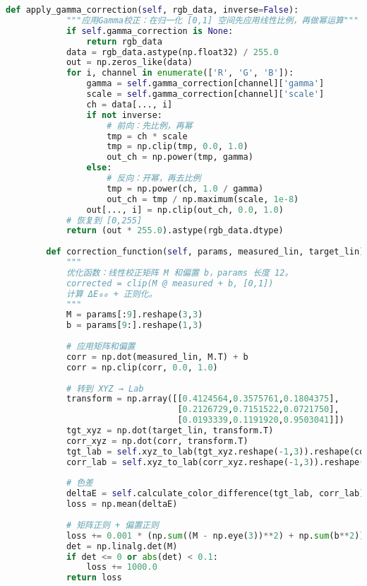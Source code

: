 \begin{lstlisting}[language=Python]
        def apply_gamma_correction(self, rgb_data, inverse=False):
            """应用Gamma校正：在归一化 [0,1] 空间先应用线性比例，再做幂运算"""
            if self.gamma_correction is None:
                return rgb_data
            data = rgb_data.astype(np.float32) / 255.0
            out = np.zeros_like(data)
            for i, channel in enumerate(['R', 'G', 'B']):
                gamma = self.gamma_correction[channel]['gamma']
                scale = self.gamma_correction[channel]['scale']
                ch = data[..., i]
                if not inverse:
                    # 前向：先比例，再幂
                    tmp = ch * scale
                    tmp = np.clip(tmp, 0.0, 1.0)
                    out_ch = np.power(tmp, gamma)
                else:
                    # 反向：开幂，再去比例
                    tmp = np.power(ch, 1.0 / gamma)
                    out_ch = tmp / np.maximum(scale, 1e-8)
                out[..., i] = np.clip(out_ch, 0.0, 1.0)
            # 恢复到 [0,255]
            return (out * 255.0).astype(rgb_data.dtype)
        
        def correction_function(self, params, measured_lin, target_lin):
            """
            优化函数：线性校正矩阵 M 和偏置 b，params 长度 12。
            corrected = clip(M @ measured + b, [0,1])
            计算 ΔE₀₀ + 正则化。
            """
            M = params[:9].reshape(3,3)
            b = params[9:].reshape(1,3)
    
            # 应用矩阵和偏置
            corr = np.dot(measured_lin, M.T) + b
            corr = np.clip(corr, 0.0, 1.0)
    
            # 转到 XYZ → Lab
            transform = np.array([[0.4124564,0.3575761,0.1804375],
                                  [0.2126729,0.7151522,0.0721750],
                                  [0.0193339,0.1191920,0.9503041]])
            tgt_xyz = np.dot(target_lin, transform.T)
            corr_xyz = np.dot(corr, transform.T)
            tgt_lab = self.xyz_to_lab(tgt_xyz.reshape(-1,3)).reshape(corr.shape)
            corr_lab = self.xyz_to_lab(corr_xyz.reshape(-1,3)).reshape(corr.shape)
    
            # 色差
            deltaE = self.calculate_color_difference(tgt_lab, corr_lab)
            loss = np.mean(deltaE)
    
            # 矩阵正则 + 偏置正则
            loss += 0.001 * (np.sum((M - np.eye(3))**2) + np.sum(b**2))
            det = np.linalg.det(M)
            if det <= 0 or abs(det) < 0.1:
                loss += 1000.0
            return loss
        

\end{lstlisting}
